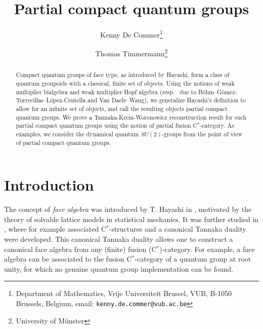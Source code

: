 \documentclass[11pt]{article}
\date{}
\theoremstyle{definition}
\numberwithin{equation}{section}
\begin{document}
\title{Partial compact quantum groups}

\author{Kenny De Commer\thanks{Department of Mathematics, Vrije Universiteit Brussel, VUB, B-1050 Brussels, Belgium, email: {\tt kenny.de.commer@vub.ac.be}}
\and Thomas Timmermann\thanks{University of M\"{u}nster}}

\maketitle

\begin{abstract}
\noindent Compact quantum groups of face type, as introduced by Hayashi, form a class of quantum groupoids with a classical, finite set of objects. Using the notions of weak multiplier bialgebra and weak multiplier Hopf algebra (resp.~ due to B{\"o}hm--G\'{o}mez-Torrecillas--L\'{o}pez-Centella and Van Daele--Wang), we generalize Hayashi's definition to allow for an infinite set of objects, and call the resulting objects partial compact quantum groups. We prove a Tannaka-Krein-Woronowicz reconstruction result for such partial compact quantum groups using the notion of partial fusion C$^*$-category. As examples, we consider the dynamical quantum $SU(2)$-groups from the point of view of partial compact quantum groups.
\end{abstract}







\tableofcontents

\section*{Introduction}

The concept of \emph{face algebra} was introduced by T. Hayashi in \cite{Hay2}, motivated by the theory of solvable lattice models in statistical mechanics. It was further studied in \cite{Hay1,Hay3,Hay4,Hay5,Hay6,Hay7}, where for example associated C$^*$-structures and a canonical Tannaka duality were developed. This canonical Tannaka duality allows one to construct a canonical face algebra from any (finite) fusion (C$^*$)-category. For example, a face algebra can be associated to the fusion C$^*$-category of a quantum group at root unity, for which no genuine quantum group implementation can be found. 
\end{document}
